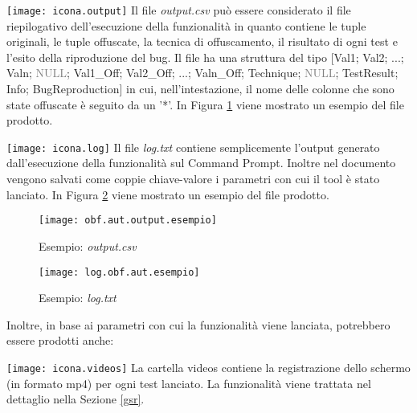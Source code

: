 \begin{tcolorbox}[colback=white, colframe=lightgray]
	 \texttt{[image: icona.output]} \newline
Il file \emph{output.csv} può essere considerato il file riepilogativo dell'esecuzione della funzionalità in quanto contiene le tuple originali, le tuple offuscate, la tecnica di offuscamento, il risultato di ogni test e l'esito della riproduzione del bug. Il file ha una struttura del tipo [Val1; Val2; ...; Valn; \textcolor{gray}{NULL}; Val1\_Off; Val2\_Off; ...; Valn\_Off; Technique; \textcolor{gray}{NULL}; TestResult; Info; BugReproduction] in cui, nell'intestazione,  il nome delle colonne che sono state offuscate è seguito da un '*'. In Figura \ref{fig:obfaut.output.es} viene mostrato un esempio del file prodotto.
\end{tcolorbox}




\begin{tcolorbox}[colback=white, colframe=lightgray]
	 \texttt{[image: icona.log]} \newline
Il file \emph{log.txt} contiene semplicemente l'output generato dall'esecuzione della funzionalità sul Command Prompt. Inoltre nel documento vengono salvati come coppie chiave-valore i parametri con cui il tool è stato lanciato. In Figura \ref{fig:obf.aut.log.es} viene mostrato un esempio del file prodotto.  
\end{tcolorbox}





\begin{figure}[H]
	\texttt{[image: obf.aut.output.esempio]}
	\centering
	\caption{Esempio: \emph{output.csv}}
    \label{fig:obfaut.output.es}
\end{figure}

\begin{figure}[H]
	\texttt{[image: log.obf.aut.esempio]}
	\centering
	\caption{Esempio: \emph{log.txt}}
    \label{fig:obf.aut.log.es}
\end{figure}

\noindent Inoltre, in base ai parametri con cui la funzionalità viene lanciata, potrebbero essere prodotti anche:
\begin{tcolorbox}[colback=white, colframe=lightgray]
	 \texttt{[image: icona.videos]} \newline
La cartella videos contiene la registrazione dello schermo (in formato mp4) per ogni test lanciato. La funzionalità viene trattata nel dettaglio nella Sezione \ref{gsr}.
\end{tcolorbox}

